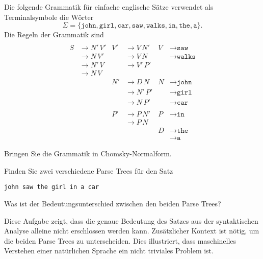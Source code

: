Die folgende Grammatik für einfache englische Sätze verwendet
als Terminalsymbole die Wörter
\[
\Sigma
=
\{
\texttt{john},
\texttt{girl},
\texttt{car},
\texttt{saw},
\texttt{walks},
\texttt{in},
\texttt{the},
\texttt{a}
\}.
\]
Die Regeln der Grammatik sind
\begin{align*}
\\
S&\to N'\, V'
& V'&\to V\, N'
& V &\to \texttt{saw}
\\
  &\to N\, V'
  &&\to V\, N
  &&\to \texttt{walks}
\\
  &\to N'\, V
  &&\to V'\, P'
\\
 &\to N\, V
\\
  &
  &N'&\to D\, N
  &N &\to \texttt{john}
\\
  &&
  &\to N'\,P'
  &&\to \texttt{girl}
\\
  &
  &&\to N\, P'
  &&\to \texttt{car}
\\
\\
  &
  &P'&\to P\,N'
  &P&\to \texttt{in}
\\
  &
  &&\to P\, N
\\
  &
  &&
  &D&\to \texttt{the}
\\
  &
  &&
  &&\to \texttt{a}
\end{align*}
\begin{teilaufgaben}
\item
Bringen Sie die
Grammatik in Chomsky-Normalform.
\item
Finden Sie zwei verschiedene Parse Trees für den Satz
\begin{center}
\texttt{john saw the girl in a car}
\end{center}
\item Was ist der Bedeutungsunterschied zwischen den beiden Parse Trees?
\end{teilaufgaben}
Diese Aufgabe zeigt, dass die genaue Bedeutung des Satzes aus der
syntaktischen Analyse alleine nicht erschlossen werden kann.
Zusätzlicher Kontext ist nötig, um die beiden Parse Trees zu unterscheiden.
Dies illustriert, dass maschinelles Verstehen einer natürlichen
Sprache ein nicht triviales Problem ist.



